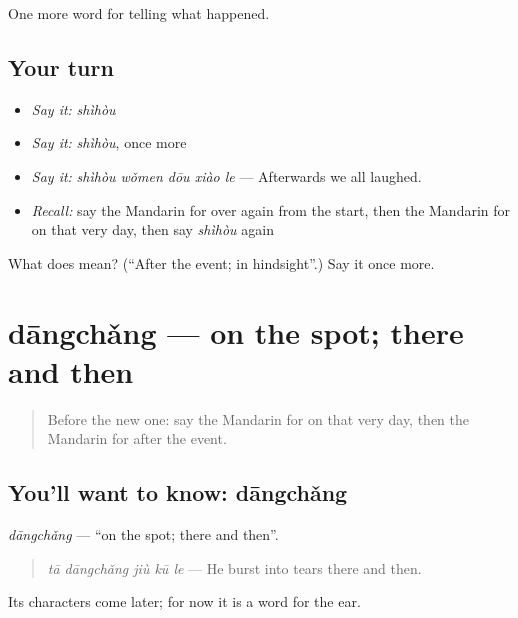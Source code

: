 \begin{grammarlens}[title={What you've built}]
One more word for telling what happened.
\end{grammarlens}

\subsection*{Your turn}
\begin{itemize}
\raggedright
  \item \emph{Say it:} \emph{shìhòu}
  \item \emph{Say it:} \emph{shìhòu}, once more
  \item \emph{Say it:} \emph{shìhòu wǒmen dōu xiào le} — Afterwards we all laughed.
  \item \emph{Recall:} say the Mandarin for over again from the start, then the Mandarin for on that very day, then say \emph{shìhòu} again
\end{itemize}

\begin{tcolorbox}[breakable,colback=teal!4,colframe=teal!35!black,title={Before you move on}]
What does  mean? (\textquotedblleft{}After the event; in hindsight\textquotedblright{}.) Say it once more.
\end{tcolorbox}
\section[dāngchǎng]{dāngchǎng — on the spot; there and then}

\label{lesson:ZH-C295-dangchang}



\begin{quote}
Before the new one: say the Mandarin for on that very day, then the Mandarin for after the event.
\end{quote}

\subsection*{You'll want to know: dāngchǎng}
\emph{dāngchǎng} — \textquotedblleft{}on the spot; there and then\textquotedblright{}.

\begin{quote}
\emph{tā dāngchǎng jiù kū le} — He burst into tears there and then.
\end{quote}

Its characters come later; for now it is a word for the ear.

